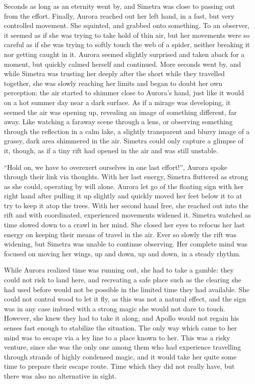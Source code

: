 Seconds as long as an eternity went by, and Simetra was close to passing out from the effort. Finally, Aurora reached out her left hand, in a fast, but very controlled movement. She squinted, and grabbed onto something. To an observer, it seemed as if she was trying to take hold of thin air, but her movements were so careful as if she was trying to softly touch the web of a spider, neither breaking it nor getting caught in it. Aurora seemed slightly surprised and taken aback for a moment, but quickly calmed herself and continued. More seconds went by, and while Simetra was trusting her deeply after the short while they travelled together, she was slowly reaching her limits and began to doubt her own perception: the air started to shimmer close to Aurora's hand, just like it would on a hot summer day near a dark surface. As if a mirage was developing, it seemed the air was opening up, revealing an image of something different, far away. Like watching a faraway scene through a lens, or observing something through the reflection in a calm lake, a slightly transparent and blurry image of a grassy, dark area shimmered in the air. Simetra could only capture a glimpse of it, though, as if a tiny rift had opened in the air and was still unstable.

\enquote{Hold on, we have to overexert ourselves in one last effort!}, Aurora spoke through their link via thoughts. With her last energy, Simetra fluttered as strong as she could, operating by will alone. Aurora let go of the floating sign with her right hand after pulling it up slightly and quickly moved her feet below it to at try to keep it atop the trees. With her second hand free, she reached out into the rift and with coordinated, experienced movements widened it. Simetra watched as time slowed down to a crawl in her mind. She closed her eyes to refocus her last energy on keeping their means of travel in the air. Ever so slowly the rift was widening, but Simetra was unable to continue observing. Her complete mind was focused on moving her wings, up and down, up and down, in a steady rhythm.

\fancybreaker{}

While Aurora realized time was running out, she had to take a gamble: they could not risk to land here, and recreating a safe place such as the clearing she had used before would not be possible in the limited time they had available. She could not control wood to let it fly, as this was not a natural effect, and the sign was in any case imbued with a strong magic she would not dare to touch. However, she knew they had to take it along, and Apollo would not regain his senses fast enough to stabilize the situation. The only way which came to her mind was to escape via a ley line to a place known to her. This was a risky venture, since she was the only one among them who had experience travelling through strands of highly condensed magic, and it would take her quite some time to prepare their escape route. Time which they did not really have, but there was also no alternative in sight.

